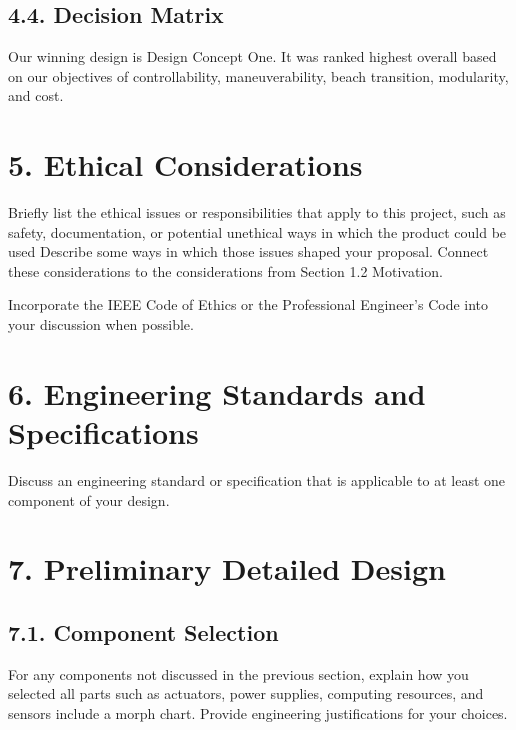 \documentclass[10pt]{article}
\begin{document}
\subsection{4.4. Decision Matrix}
%
Our winning design is Design Concept One. It was ranked highest overall based on our objectives of controllability, maneuverability, beach transition, modularity, and cost. 

\section{5. Ethical Considerations}
Briefly list the ethical issues or responsibilities that apply to this project, such as safety, documentation, or potential unethical ways in which the product could be used
Describe some ways in which those issues shaped your proposal.
Connect these considerations to the considerations from Section 1.2 Motivation.

  Incorporate the IEEE Code of Ethics or the Professional Engineer’s Code into your discussion when possible. 

\section{6. Engineering Standards and Specifications}
Discuss an engineering standard or specification that is applicable to at least one component of your design.

\section{7. Preliminary Detailed Design}
\subsection{7.1. Component Selection}
For any components not discussed in the previous section, explain how you selected all parts such as actuators, power supplies, computing resources, and sensors include a morph chart.  Provide engineering justifications for your choices.
 
\end{document}
